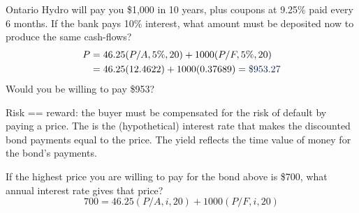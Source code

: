 \begin{example}
    Ontario Hydro will pay you \$1,000 in 10 years, plus coupons at 9.25\%
    paid every 6 months. If the bank pays 10\% interest, what amount must be
    deposited now to produce the same cash-flows?
    \\
    \begin{align*}
        P &= 46.25(P/A,5\%,20) + 1000(P/F,5\%,20)\\
        &= 46.25(12.4622) + 1000(0.37689) = \db{\$953.27}
    \end{align*}
    Would you be willing to pay \$953?
    \\
\end{example}

\begin{definition}[Yield]
    Risk == reward: the buyer must be compensated for the risk of default by
    paying a  price. The  is the (hypothetical)
    interest rate that makes the discounted bond payments equal to the price.
    The yield reflects the time value of money for the bond's payments.
\end{definition}

\begin{example}
    If the highest price you are willing to pay for the bond above is \$700,
    what annual interest rate gives that price?
    \[700 = 46.25(P/A,i,20) + 1000(P/F,i,20)\]
\end{example}

